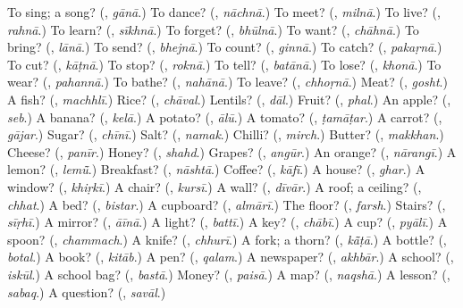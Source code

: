 \begin{tcolorbox}[breakable,colback=teal!4,colframe=teal!35!black,title={Before you move on}]
To sing; a song? (\textbf{}, \emph{gānā}.) To dance? (\textbf{}, \emph{nāchnā}.) To meet? (\textbf{}, \emph{milnā}.) To live? (\textbf{}, \emph{rahnā}.) To learn? (\textbf{}, \emph{sīkhnā}.) To forget? (\textbf{}, \emph{bhūlnā}.) To want? (\textbf{}, \emph{chāhnā}.) To bring? (\textbf{}, \emph{lānā}.) To send? (\textbf{}, \emph{bhejnā}.) To count? (\textbf{}, \emph{ginnā}.) To catch? (\textbf{}, \emph{pakaṛnā}.) To cut? (\textbf{}, \emph{kāṭnā}.) To stop? (\textbf{}, \emph{roknā}.) To tell? (\textbf{}, \emph{batānā}.) To lose? (\textbf{}, \emph{khonā}.) To wear? (\textbf{}, \emph{pahannā}.) To bathe? (\textbf{}, \emph{nahānā}.) To leave? (\textbf{}, \emph{chhoṛnā}.) Meat? (\textbf{}, \emph{gosht}.) A fish? (\textbf{}, \emph{machhlī}.) Rice? (\textbf{}, \emph{chāval}.) Lentils? (\textbf{}, \emph{dāl}.) Fruit? (\textbf{}, \emph{phal}.) An apple? (\textbf{}, \emph{seb}.) A banana? (\textbf{}, \emph{kelā}.) A potato? (\textbf{}, \emph{ālū}.) A tomato? (\textbf{}, \emph{ṭamāṭar}.) A carrot? (\textbf{}, \emph{gājar}.) Sugar? (\textbf{}, \emph{chīnī}.) Salt? (\textbf{}, \emph{namak}.) Chilli? (\textbf{}, \emph{mirch}.) Butter? (\textbf{}, \emph{makkhan}.) Cheese? (\textbf{}, \emph{panīr}.) Honey? (\textbf{}, \emph{shahd}.) Grapes? (\textbf{}, \emph{angūr}.) An orange? (\textbf{}, \emph{nārangī}.) A lemon? (\textbf{}, \emph{lemū̃}.) Breakfast? (\textbf{}, \emph{nāshtā}.) Coffee? (\textbf{}, \emph{kāfī}.) A house? (\textbf{}, \emph{ghar}.) A window? (\textbf{}, \emph{khiṛkī}.) A chair? (\textbf{}, \emph{kursī}.) A wall? (\textbf{}, \emph{dīvār}.) A roof; a ceiling? (\textbf{}, \emph{chhat}.) A bed? (\textbf{}, \emph{bistar}.) A cupboard? (\textbf{}, \emph{almārī}.) The floor? (\textbf{}, \emph{farsh}.) Stairs? (\textbf{}, \emph{sīṛhī}.) A mirror? (\textbf{}, \emph{āīnā}.) A light? (\textbf{}, \emph{battī}.) A key? (\textbf{}, \emph{chābī}.) A cup? (\textbf{}, \emph{pyālī}.) A spoon? (\textbf{}, \emph{chammach}.) A knife? (\textbf{}, \emph{chhurī}.) A fork; a thorn? (\textbf{}, \emph{kā̃ṭā}.) A bottle? (\textbf{}, \emph{botal}.) A book? (\textbf{}, \emph{kitāb}.) A pen? (\textbf{}, \emph{qalam}.) A newspaper? (\textbf{}, \emph{akhbār}.) A school? (\textbf{}, \emph{iskūl}.) A school bag? (\textbf{}, \emph{bastā}.) Money? (\textbf{}, \emph{paisā}.) A map? (\textbf{}, \emph{naqshā}.) A lesson? (\textbf{}, \emph{sabaq}.) A question? (\textbf{}, \emph{savāl}.)
\end{tcolorbox}
